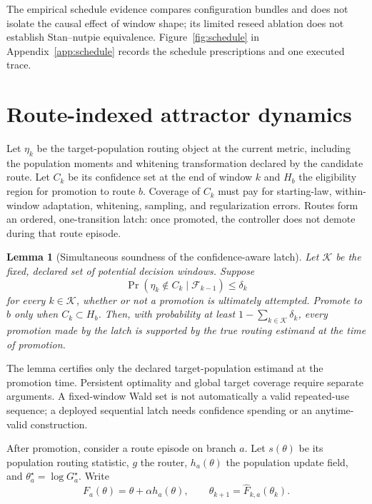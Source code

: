 \documentclass[11pt]{article}
\theoremstyle{plain}
\newtheorem{lemma}[theorem]{Lemma}
\theoremstyle{definition}
\theoremstyle{remark}
\begin{document}
The empirical schedule evidence compares configuration bundles and does not
isolate the causal effect of window shape; its limited reseed ablation does not
establish Stan--nutpie equivalence. Figure~\ref{fig:schedule} in
Appendix~\ref{app:schedule} records the schedule prescriptions and one
executed trace.

\section{Route-indexed attractor dynamics}\label{sec:attractor}

Let $\eta_k$ be the target-population routing object at the current metric,
including the population moments and whitening transformation declared by the
candidate route. Let $C_k$ be its confidence set at the end of window $k$ and
$H_b$ the eligibility region for promotion to route $b$. Coverage of $C_k$ must
pay for starting-law, within-window adaptation, whitening, sampling, and
regularization errors. Routes form an ordered, one-transition latch: once
promoted, the controller does not demote during that route episode.

\begin{lemma}[Simultaneous soundness of the confidence-aware latch]\label{lem:latch}
Let $\mathcal K$ be the fixed, declared set of potential decision windows.
Suppose
\[
  \Pr(\eta_k\notin C_k\mid\mathcal F_{k-1})\le\delta_k
\]
for every $k\in\mathcal K$, whether or not a promotion is ultimately attempted.
Promote to $b$ only when $C_k\subset H_b$. Then, with probability at least
$1-\sum_{k\in\mathcal K}\delta_k$, every promotion made by the latch is
supported by the true routing estimand at the time of promotion.
\end{lemma}

The lemma certifies only the declared target-population estimand at the
promotion time. Persistent optimality and global target coverage require
separate arguments. A fixed-window Wald set is not automatically a valid
repeated-use sequence; a deployed sequential latch needs confidence spending
or an anytime-valid construction.

After promotion, consider a route episode on branch $a$. Let $s(\theta)$ be its
population routing statistic, $g$ the router, $h_a(\theta)$ the population
update field, and $\theta_a^\star=\log G_a^\star$. Write
\begin{equation}
  F_a(\theta)=\theta+\alpha h_a(\theta),\qquad
  \theta_{k+1}=\widehat F_{k,a}(\theta_k).                    \label{eq:update}
\end{equation}
\end{document}
